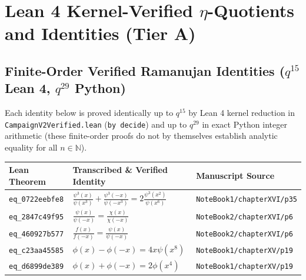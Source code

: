 \documentclass[11pt,twoside,openright]{book}
\begin{document}
\chapter{Lean 4 Kernel-Verified $\eta$-Quotients and Identities (Tier A)}
\section{Finite-Order Verified Ramanujan Identities ($q^{15}$ Lean 4, $q^{29}$ Python)}
Each identity below is proved identically up to $q^{15}$ by Lean 4 kernel reduction in \texttt{CampaignV2Verified.lean} (\texttt{by decide}) and up to $q^{29}$ in exact Python integer arithmetic (these finite-order proofs do not by themselves establish analytic equality for all $n \in \mathbb{N}$).
\begin{longtable}{p{2.4cm}p{7.8cm}p{3.6cm}}
\toprule
\textbf{Lean Theorem} & \textbf{Transcribed \& Verified Identity} & \textbf{Manuscript Source} \\
\midrule
\endhead
\texttt{eq\_0722eebfe8} & $\frac{\psi^3(x)}{\psi(x^3)} + \frac{\psi^3(-x)}{\psi(-x^3)} = 2 \frac{\psi^3(x^2)}{\psi(x^6)}$ & \texttt{NoteBook1/chapterXVI/p35} \\
\texttt{eq\_2847c49f95} & $\frac{\psi(x)}{\psi(-x)} = \frac{\chi(x)}{\chi(-x)}$ & \texttt{NoteBook2/chapterXVI/p6} \\
\texttt{eq\_460927b577} & $\frac{f(x)}{f(-x)} = \frac{\psi(x)}{\psi(-x)}$ & \texttt{NoteBook2/chapterXVI/p6} \\
\texttt{eq\_c23aa45585} & $\phi(x) - \phi(-x) = 4x\psi(x^8)$ & \texttt{NoteBook1/chapterXV/p19} \\
\texttt{eq\_d6899de389} & $\phi(x) + \phi(-x) = 2\phi(x^4)$ & \texttt{NoteBook1/chapterXV/p19} \\
\bottomrule
\end{longtable}
\end{document}
